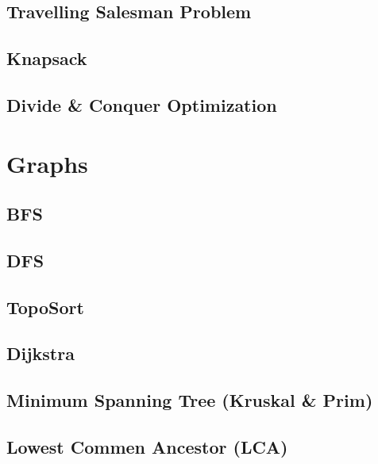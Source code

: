 \documentclass[10pt,landscape,twocolumn,a4paper,notitlepage]{article}
\begin{document}
  \subsection{Travelling Salesman Problem}
  

  \subsection{Knapsack}
  

  \subsection{Divide \& Conquer Optimization}
  

\section{Graphs}
  \subsection{BFS}
  

  \subsection{DFS}
  

  \subsection{TopoSort}
  

  \subsection{Dijkstra}
  
  
  \subsection{Minimum Spanning Tree (Kruskal \& Prim)}
  
  
  \subsection{Lowest Commen Ancestor (LCA)}
  
\end{document}

